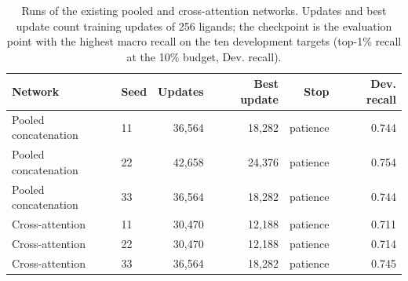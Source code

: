 \begin{table}[h]
\caption{Runs of the existing pooled and cross-attention networks. Updates and best update count training updates of 256 ligands; the checkpoint is the evaluation point with the highest macro recall on the ten development targets (top-1\% recall at the 10\% budget, Dev. recall).}
\label{tab:si_joint_runs}
\small
\begin{tabular}{llrrrr}
\toprule
Network & Seed & Updates & Best update & Stop & Dev. recall \\
\midrule
Pooled concatenation & 11 & 36{,}564 & 18{,}282 & patience & 0.744 \\
Pooled concatenation & 22 & 42{,}658 & 24{,}376 & patience & 0.754 \\
Pooled concatenation & 33 & 36{,}564 & 18{,}282 & patience & 0.744 \\
Cross-attention & 11 & 30{,}470 & 12{,}188 & patience & 0.711 \\
Cross-attention & 22 & 30{,}470 & 12{,}188 & patience & 0.714 \\
Cross-attention & 33 & 36{,}564 & 18{,}282 & patience & 0.745 \\
\bottomrule
\end{tabular}
\end{table}
